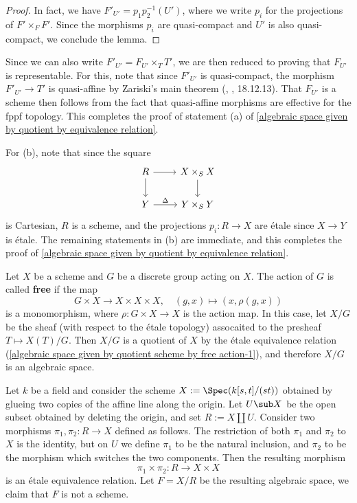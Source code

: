 \begin{proof}
In fact, we have $F'_{U'}=p_1p_2^{-1}(U')$, where we write $p_i$ for the projections of $F'\times_FF'$. Since the morphisms $p_i$ are quasi-compact and $U'$ is also quasi-compact, we conclude the lemma.
\end{proof}
Since we can also write $F'_{U'}=F_{U'}\times_TT'$, we are then reduced to proving that $F_{U'}$ is representable. For this, note that since $F'_{U'}$ is quasi-compact, the morphism $F'_{U'}\to T'$ is quasi-affine by Zariski's main theorem (\cite{EGA4-4}, , 18.12.13). That $F_{U'}$ is a scheme then follows from the fact that quasi-affine morphisms are effective for the fppf topology. This completes the proof of statement (a) of \cref{algebraic space given by quotient by equivalence relation}.\par
For (b), note that since the square
\[\begin{tikzcd}
R\ar[d]\ar[r]&X\times_SX\ar[d]\\
Y\ar[r,"\Delta"]&Y\times_SY
\end{tikzcd}\]
is Cartesian, $R$ is a scheme, and the projections $p_i:R\to X$ are \'etale since $X\to Y$ is \'etale. The remaining statements in (b) are immediate, and this completes the proof of \cref{algebraic space given by quotient by equivalence relation}.

\begin{example}\label{algebraic space given by quotient scheme by free action}
Let $X$ be a scheme and $G$ be a discrete group acting on $X$. The action of $G$ is called \textbf{free} if the map
\begin{equation}\label{algebraic space given by quotient scheme by free action-1}
G\times X\to X\times X\times X,\quad (g,x)\mapsto (x,\rho(g,x))
\end{equation}
is a monomorphism, where $\rho:G\times X\to X$ is the action map. In this case, let $X/G$ be the sheaf (with respect to the \'etale topology) assocaited to the presheaf $T\mapsto X(T)/G$. Then $X/G$ is a quotient of $X$ by the \'etale equivalence relation (\ref{algebraic space given by quotient scheme by free action-1}), and therefore $X/G$ is an algebraic space.
\end{example}

\begin{example}
Let $k$ be a field and consider the scheme $X:=\Spec(k[s,t]/(st))$ obtained by glueing two copies of the affine line along the origin. Let $U\sub X$ be the open subset obtained by deleting the origin, and set $R:=X\coprod U$. Consider two morphisms $\pi_1,\pi_2:R\to X$ defined as follows. The restriction of both $\pi_1$ and $\pi_2$ to $X$ is the identity, but on $U$ we define $\pi_1$ to be the natural inclusion, and $\pi_2$ to be the morphism which switches the two components. Then the resulting morphism
\[\pi_1\times\pi_2:R\to X\times X\]
is an \'etale equivalence relation. Let $F=X/R$ be the resulting algebraic space, we claim that $F$ is not a scheme. 
\end{example}

